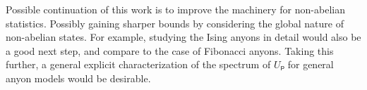 Possible continuation of this work is to improve the machinery for non-abelian statistics. Possibly gaining sharper bounds by considering the global nature of non-abelian states. For example, studying the Ising anyons in detail would also be a good next step, and compare to the case of Fibonacci anyons. Taking this further, a general explicit characterization of the spectrum of $Uₚ$ for general anyon models would be desirable.
